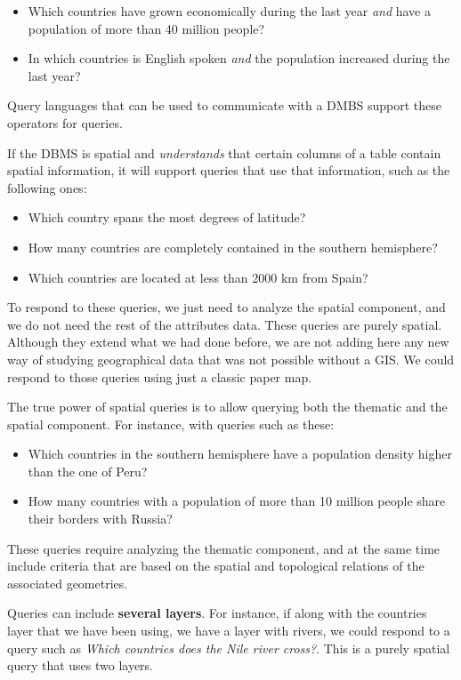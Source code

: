 \begin{itemize}
 \item Which countries have grown economically during the last year \emph{and} have a population of more than 40 million people?
\item In which countries is English spoken \emph{and} the population increased during the last year?
\end{itemize}

Query languages that can be used to communicate with a DMBS support these operators for queries.

If the DBMS is spatial and \emph{understands} that certain columns of a table contain spatial information, it will support queries that use that information, such as the following ones:

\begin{itemize}
\item Which country spans the most degrees of latitude?
\item How many countries are completely contained in the southern hemisphere?
\item Which countries are located at less than 2000 km from Spain?
\end{itemize}

To respond to these queries, we just need to analyze the spatial component, and we do not need the rest of the attributes data. These queries are purely spatial. Although they extend what we had done before, we are not adding here any new way of studying geographical data that was not possible without a GIS. We could respond to those queries using just a classic paper map.

The true power of spatial queries is to allow querying both the thematic and the spatial component. For instance, with queries such as these:

\begin{itemize}
 \item Which countries in the southern hemisphere have a population density higher than the one of Peru?
\item How many countries with a population of more than 10 million people share their borders with Russia?
\end{itemize}

These queries require analyzing the thematic component, and at the same time include criteria that are based on the spatial and topological relations of the associated geometries.

Queries can include \textbf{several layers}. For instance, if along with the countries layer that we have been using, we have a layer with rivers, we could respond to a query such as \emph{Which countries does the Nile river cross?}. This is a purely spatial query that uses two layers.

